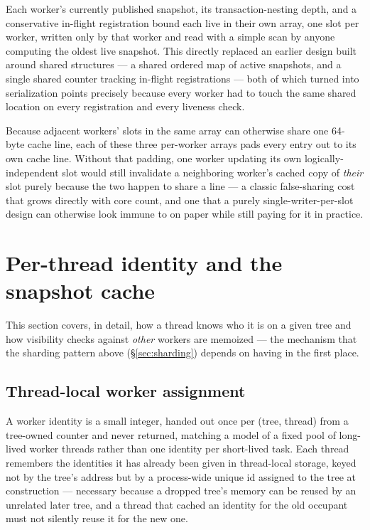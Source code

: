 \documentclass[11pt]{article}
\begin{document}
Each worker's currently published snapshot, its transaction-nesting depth, and a
conservative in-flight registration bound each live in their own array, one slot per
worker, written only by that worker and read with a simple scan by anyone computing
the oldest live snapshot. This directly replaced an earlier design built around
shared structures --- a shared ordered map of active snapshots, and a single shared
counter tracking in-flight registrations --- both of which turned into serialization
points precisely because every worker had to touch the same shared location on
every registration and every liveness check.

Because adjacent workers' slots in the same array can otherwise share one 64-byte
cache line, each of these three per-worker arrays pads every entry out to its own
cache line. Without that padding, one worker updating its own logically-independent
slot would still invalidate a neighboring worker's cached copy of \emph{their}
slot purely because the two happen to share a line --- a classic false-sharing cost
that grows directly with core count, and one that a purely single-writer-per-slot
design can otherwise look immune to on paper while still paying for it in practice.

\section{Per-thread identity and the snapshot cache}
\label{sec:snapcache}

This section covers, in detail, how a thread knows who it is on a given tree and
how visibility checks against \emph{other} workers are memoized --- the mechanism
that the sharding pattern above (\S\ref{sec:sharding}) depends on having in the
first place.

\subsection{Thread-local worker assignment}

A worker identity is a small integer, handed out once per (tree, thread) from a
tree-owned counter and never returned, matching a model of a fixed pool of
long-lived worker threads rather than one identity per short-lived task. Each thread
remembers the identities it has already been given in thread-local storage, keyed
not by the tree's address but by a process-wide unique id assigned to the tree at
construction --- necessary because a dropped tree's memory can be reused by an
unrelated later tree, and a thread that cached an identity for the old occupant
must not silently reuse it for the new one.
\end{document}
